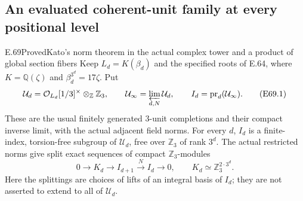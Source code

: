 \subsection{An evaluated coherent-unit family at every positional level}

\begin{statement}{E.69}{Proved}{Kato's norm theorem in the actual complex tower and a product of global section fibers}
Keep $L_d=K(\beta_d)$ and the specified roots of E.64, where
$K=\mathbb Q(\zeta)$ and $\beta_d^{3^d}=17\zeta$.
Put
\[
 \mathcal U_d=\mathcal O_{L_d}[1/3]^\times
                         \otimes_{\mathbb Z}\mathbb Z_3,
 \qquad
 \mathcal U_\infty=\varprojlim_{d,N}\mathcal U_d,
 \qquad
 I_d=\operatorname{pr}_d(\mathcal U_\infty).
 \tag{E69.1}
\]
These are the usual finitely generated $3$-unit completions and their
compact inverse limit, with the actual adjacent field norms.
For every $d$, $I_d$ is a finite-index, torsion-free subgroup of
$\mathcal U_d$, free over $\mathbb Z_3$ of rank $3^d$.
The actual restricted norms give split exact sequences of compact
$\mathbb Z_3$-modules
\[
 0\longrightarrow K_d\longrightarrow I_{d+1}
      \xrightarrow{\ N\ }I_d\longrightarrow0,
 \qquad K_d\simeq\mathbb Z_3^{2\cdot3^d}.
 \tag{E69.2}
\]
Here the splittings are choices of lifts of an integral basis of
$I_d$; they are not asserted to extend to all of $\mathcal U_d$.


\end{statement}
